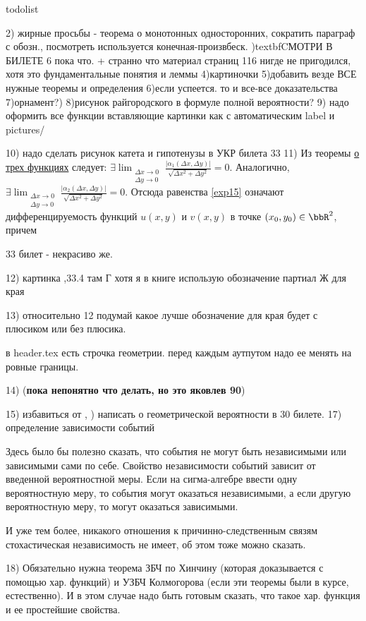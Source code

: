todolist

 2) жирные просьбы - теорема о монотонных односторонних, сократить параграф с обозн., посмотреть используется конечная-произвбеск.
\3)textbf{CМОТРИ В БИЛЕТЕ 6 пока что. + странно что материал страниц 116 нигде не пригодился, хотя это фундаментальные понятия и леммы}
 4)картиночки
 5)добавить везде ВСЕ нужные теоремы и определения
 6)если успеется. то и все-все доказательства
 7)орнамент?)
 8)рисунок райгородского в формуле полной вероятности?
 9) надо оформить все функции вставляющие картинки как \usepict с автоматическим label и pictures/
 
 10) надо сделать рисунок катета и гипотенузы в УКР билета 33
 11) Из теоремы \hyperref[exp14]{о трех функциях} следует: $\exists \lim_{\substack{\Delta x \to 0\\ \Delta y \to 0}}\limits \frac{|\alpha_1(\Delta x,\Delta y)|}{\sqrt{\Delta x ^2 + \Delta y^2}} = 0.$
Аналогично, $\exists \lim_{\substack{\Delta x \to 0\\ \Delta y \to 0}}\limits \frac{|\alpha_2(\Delta x,\Delta y)|}{\sqrt{\Delta x^2 + \Delta y^2}} = 0$. 
Отсюда равенства \eqref{exp15} означают дифференцируемость функций $u(x,y)$ и $v(x,y)$ в точке $(x_0,y_0) \in \bbR^2$, причем 


33 билет - некрасиво же.

12) картинка ,33.4 там Г хотя я в книге использую обозначение партиал Ж для края

13) относительно 12 подумай какое лучше обозначение для края будет с плюсиком или без плюсика. 

в header.tex есть строчка геометрии. перед каждым аутпутом надо ее менять на ровные границы.

14) (\textbf{пока непонятно что делать, но это яковлев 90})

15) избавиться от \fa, ) написать о геометрической вероятности в 30 билете.
17) определение зависимости событий

Здесь было бы полезно сказать, что события не могут быть независимыми или зависимыми сами по себе. Свойство независимости событий зависит от введенной вероятностной меры. Если на сигма-алгебре ввести одну вероятностную меру, то события могут оказаться независимыми, а если другую вероятностную меру, то могут оказаться зависимыми.

И уже тем более, никакого отношения к причинно-следственным связям стохастическая независимость не имеет, об этом тоже можно сказать.

18) Обязательно нужна теорема ЗБЧ по Хинчину (которая доказывается с помощью хар. функций) и УЗБЧ Колмогорова (если эти теоремы были в курсе, естественно). И в этом случае надо быть готовым сказать, что такое хар. функция и ее простейшие свойства.

